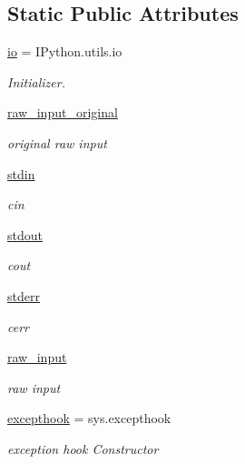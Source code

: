 \subsection*{Static Public Attributes}
\begin{DoxyCompactItemize}
\item 
\hyperlink{classvisualizer_1_1ipython__view_1_1IterableIPShell_a5e5ff109c925afa7cec40eaa7a6e24ff}{io} = I\+Python.\+utils.\+io
\begin{DoxyCompactList}\small\item\em Initializer. \end{DoxyCompactList}\item 
\hyperlink{classvisualizer_1_1ipython__view_1_1IterableIPShell_a36f65e207f3afb5e58cfdc7afd0501fc}{raw\+\_\+input\+\_\+original}
\begin{DoxyCompactList}\small\item\em original raw input \end{DoxyCompactList}\item 
\hyperlink{classvisualizer_1_1ipython__view_1_1IterableIPShell_acc5eb64e5dc1413b67d7ddba55a40f5c}{stdin}
\begin{DoxyCompactList}\small\item\em cin \end{DoxyCompactList}\item 
\hyperlink{classvisualizer_1_1ipython__view_1_1IterableIPShell_a1f01c679c43f28d28ea3e18384ce459e}{stdout}
\begin{DoxyCompactList}\small\item\em cout \end{DoxyCompactList}\item 
\hyperlink{classvisualizer_1_1ipython__view_1_1IterableIPShell_a638d5e31b08963f1c96a552d926f9e44}{stderr}
\begin{DoxyCompactList}\small\item\em cerr \end{DoxyCompactList}\item 
\hyperlink{classvisualizer_1_1ipython__view_1_1IterableIPShell_adee23ee2d2a96868317fc9d4795c3013}{raw\+\_\+input}
\begin{DoxyCompactList}\small\item\em raw input \end{DoxyCompactList}\item 
\hyperlink{classvisualizer_1_1ipython__view_1_1IterableIPShell_a998ce47996be79b89f04b4b6da2d94e9}{excepthook} = sys.\+excepthook
\begin{DoxyCompactList}\small\item\em exception hook Constructor \end{DoxyCompactList}\item 

\end{DoxyCompactItemize}
